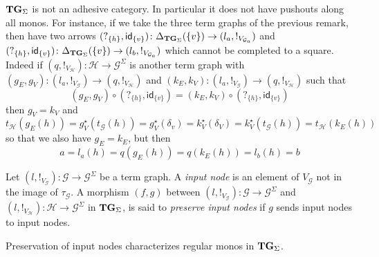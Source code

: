 \documentclass[3p]{elsarticle}
\newcommand{\catname}[1]{\textbf{\textup{#1}}}
\newcommand{\tg}[0]{\catname{TG}_{\Sigma}}
\newcommand{\commentato}[1]{ {} }
\newcommand{\id}[1]{\mathsf{id}_{#1}}
\theoremstyle{remark}
\theoremstyle{definition}
\begin{document}
{\begin{rem}
	$\tg$ is not an adhesive category. In particular it does not have pushouts along all monos. For instance, if we take the three term graphs of the previous remark, then have two arrows
	$(?_{\{h\}}, \id{\{v\}})\colon \Delta_{\tg}(\{v\})\to (l_a, !_{V_{\mathcal{G}_a}})$ and $(?_{\{h\}}, \id{\{v\}})\colon \Delta_{\tg}(\{v\})\to (l_b, !_{V_{\mathcal{G}_a}})$ which cannot be completed to a square. Indeed if $(q, !_{V_\mathcal{H}})\colon \mathcal{H}\to \mathcal{G}^\Sigma$ is another term graph with $(g_E, g_V)\colon (l_a, !_{V_{\mathcal{G}}})\to (q, !_{V_\mathcal{H}})$ and $(k_E, k_V)\colon (l_a, !_{V_{\mathcal{G}}})\to (q, !_{V_\mathcal{H}})$  such that 
	\[(g_E, g_V)\circ (?_{\{h\}}, \id{\{v\}}) = (k_E, k_V)\circ (?_{\{h\}}, \id{\{v\}})\]
	then $g_V=k_V$ and
	\[t_{\mathcal{H}}(g_E(h))=g^\star_V(t_{\mathcal{G}}(h))=g_V^\star(\delta_v)=k^\star_V(\delta_V)=k^\star_V(t_{\mathcal{G}}(h))=t_{\mathcal{H}}(k_E(h))\]
	so that we also have $g_E=k_E$, but then
	\[
	a=l_a(h)=q(g_E(h))=q(k_E(h))=l_b(h)=b\]
\end{rem}
}

\begin{defi}
	Let $(l, !_{V_{\mathcal{G}}})\colon \mathcal{G}\to \mathcal{G}^{\Sigma}$  be a term graph. A \emph{input node} is an element of $V_{\mathcal{G}}$ not in the image of $\tau_{\mathcal{G}}$.  A morphism $(f,g)$ between
	 $(l, !_{V_{\mathcal{G}}})\colon \mathcal{G}\to \mathcal{G}^{\Sigma}$ and $(l, !_{V_{\mathcal{H}}})\colon \mathcal{H}\to \mathcal{G}^{\Sigma}$ in $\tg$, is said to \emph{preserve input nodes} if $g$ sends input nodes to input nodes.
\end{defi}

\commentato{
\todo{Se questo remark sotto non serve nel pezzo sulle equivalenze possiamo toglierlo}
\begin{rem}\label{prop:image}
	Suppose that $(f,g)\colon (l, !_{V_{\mathcal{G}}})\to (l', !_{V_{\mathcal{H}}})$ preserves input nodes. Then  if $\tau_{\mathcal{H}}(h)=g(v)$ for some $v\in V_{\mathcal{G}}$ then $h$ belongs to the image of $f$. Indeed, by hypothesis $v$ must be in the image of $\tau_{\mathcal{G}}$ and so there exists $k$ such that $\tau_{\mathcal{G}}(k)=v$. But then $\tau_{\mathcal{H}}(f(k))=g(v)$ and we can conclude that $f(k)=h$.
\end{rem}
}

Preservation of input nodes characterizes regular monos in $\tg$.

\end{document}
